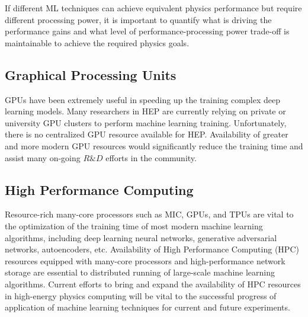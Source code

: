 If different ML techniques can achieve equivalent physics performance but require different processing power, it is important to quantify what is driving the performance gains and what level of performance-processing power trade-off is maintainable to achieve the required physics goals.

\subsection{Graphical Processing Units}
\label{subsec:GPU}

GPUs have been extremely useful in speeding up the training complex deep learning models. Many researchers in HEP are currently relying on private or university GPU clusters to perform machine learning training. Unfortunately, there is no centralized GPU resource available for HEP. Availability of greater and more modern GPU resources would significantly reduce the training time and assist many on-going $R\&D$ efforts in the community.

\subsection{High Performance Computing}

Resource-rich many-core processors such as MIC, GPUs, and TPUs are vital to the optimization of the training time of most modern machine learning algorithms, including deep learning neural networks, generative adversarial networks, autoencoders, etc. Availability of High Performance Computing (HPC) resources equipped with many-core processors and high-performance network storage are essential to distributed running of large-scale machine learning algorithms. Current efforts to bring and expand the availability of HPC resources in high-energy physics computing will be vital to the successful progress of application of machine learning techniques for current and future experiments.



